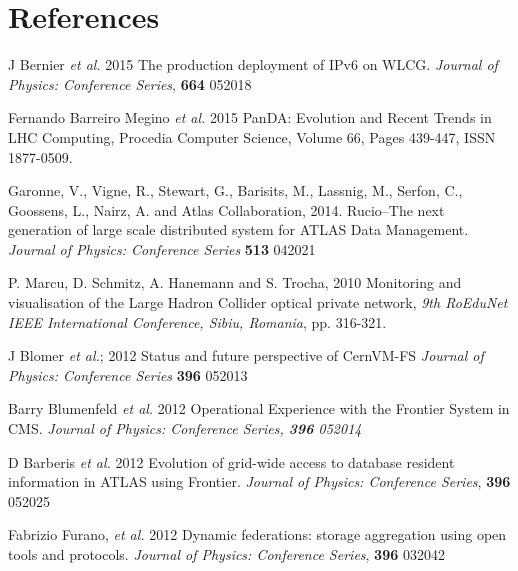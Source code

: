 \documentclass[a4paper]{jpconf}
\begin{document}
\section*{References}
\begin{thebibliography}{10}


 J Bernier \textit{et al.} 2015 The production deployment of IPv6 on WLCG. \textit{Journal of Physics: Conference Series}, \textbf{664} 052018

 Fernando Barreiro Megino \textit{et al.} 2015 PanDA: Evolution and Recent Trends in LHC Computing, Procedia Computer Science, Volume 66, Pages 439-447, ISSN 1877-0509.

 Garonne, V., Vigne, R., Stewart, G., Barisits, M., Lassnig, M., Serfon, C., Goossens, L., Nairz, A. and Atlas Collaboration, 2014. Rucio–The next generation of large scale distributed system for ATLAS Data Management. \textit{Journal of Physics: Conference Series} \textbf{513} 042021

  P. Marcu, D. Schmitz, A. Hanemann and S. Trocha, 2010 Monitoring and visualisation of the Large Hadron Collider optical private network, \textit{9th RoEduNet IEEE International Conference, Sibiu, Romania}, pp. 316-321.

 J Blomer \textit{et al.}; 2012 Status and future perspective of CernVM-FS \textit{Journal of Physics: Conference Series} \textbf{396} 052013

 Barry Blumenfeld \textit{et al.} 2012 Operational Experience with the Frontier System in CMS. \it{Journal of Physics: Conference Series}, \textbf{396} 052014

 D Barberis \textit{et al.} 2012 Evolution of grid-wide access to database resident information in ATLAS using Frontier. \textit{Journal of Physics: Conference Series}, \textbf{396} 052025  

 Fabrizio  Furano,  \textit{et al.} 2012  Dynamic federations:  storage aggregation using open tools and protocols. \textit{Journal of Physics: Conference Series}, \textbf{396} 032042

\end{thebibliography}
\end{document}
